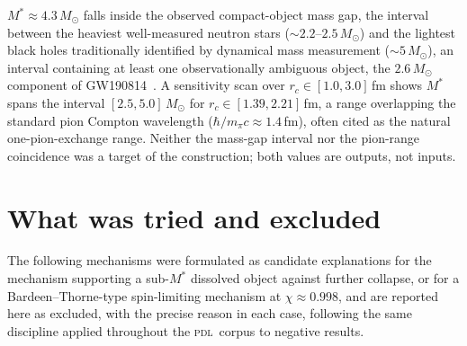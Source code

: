 \documentclass[12pt,a4paper]{article}
\newcommand{\PDL}{\textsc{pdl}}
\newcommand{\chif}{\chi}
\begin{document}
\begin{speculativebox}
$M^*\approx4.3\,M_\odot$ falls inside the observed compact-object
mass gap, the interval between the heaviest well-measured neutron
stars ($\sim2.2$--$2.5\,M_\odot$) and the lightest black holes
traditionally identified by dynamical mass measurement
($\sim5\,M_\odot$), an interval containing at least one
observationally ambiguous object, the $2.6\,M_\odot$ component of
GW190814~\citep{GW190814}. A sensitivity scan over
$r_c\in[1.0,3.0]\,$fm shows $M^*$ spans the interval
$[2.5,5.0]\,M_\odot$ for $r_c\in[1.39,2.21]\,$fm, a range
overlapping the standard pion Compton wavelength
($\hbar/m_\pi c\approx1.4\,$fm), often cited as the natural
one-pion-exchange range. Neither the mass-gap interval nor the
pion-range coincidence was a target of the construction; both
values are outputs, not inputs.
\end{speculativebox}

\section{What was tried and excluded}
\label{sec:negative}

The following mechanisms were formulated as candidate explanations
for the mechanism supporting a sub-$M^*$ dissolved object against
further collapse, or for a Bardeen--Thorne-type spin-limiting
mechanism at $\chif\approx0.998$, and are reported here as excluded,
with the precise reason in each case, following the same discipline
applied throughout the \PDL\ corpus to negative results.
\end{document}
